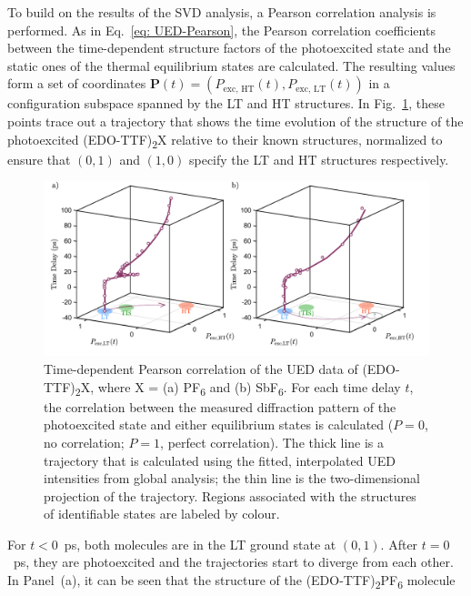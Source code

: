 To build on the results of the SVD analysis, a Pearson correlation analysis is performed.
As in Eq.~\eqref{eq: UED-Pearson}, the Pearson correlation coefficients between
the time-dependent structure factors of the photoexcited state and
the static ones of the thermal equilibrium states are calculated.
The resulting values form a set of coordinates $\boldsymbol{P}(t) = \left( P_\text{exc, HT}(t), P_\text{exc, LT}(t) \right)$
in a configuration subspace spanned by the LT and HT structures.
%
In Fig.~\ref{fig: EDOSb-Pearson}, these points trace out a trajectory that shows
the time evolution of the structure of the photoexcited (EDO-TTF)\textsubscript{2}X
relative to their known structures, normalized to ensure that
$(0, 1)$ and $(1, 0)$ specify the LT and HT structures respectively.
%
\begin{figure}[ht!]
  \centering
  \includegraphics[width = \textwidth]{Figures/fig_EDOSb_Pearson.pdf}
  \caption[Time-dependent Pearson correlation of (EDO-TTF)\textsubscript{2}X
    (X = PF\textsubscript{6}, SbF\textsubscript{6}).]{
    Time-dependent Pearson correlation of the UED data of (EDO-TTF)\textsubscript{2}X,
    where X = (a) PF\textsubscript{6} and (b) SbF\textsubscript{6}.
    For each time delay $t$, the correlation between the measured diffraction pattern of
    the photoexcited state and either equilibrium states is calculated
    ($P = 0$, no correlation; $P = 1$, perfect correlation).
    The thick line is a trajectory that is calculated
    using the fitted, interpolated UED intensities from global analysis;
    the thin line is the two-dimensional projection of the trajectory.
    Regions associated with the structures of identifiable states are labeled by colour.
  }
  \label{fig: EDOSb-Pearson}
\end{figure}
%
For $t < 0$~ps, both molecules are in the LT ground state at $(0, 1)$.
After $t = 0$~ps, they are photoexcited and the trajectories start to diverge from each other.
%
In Panel~(a), it can be seen that the structure of the (EDO-TTF)\textsubscript{2}PF\textsubscript{6} molecule

